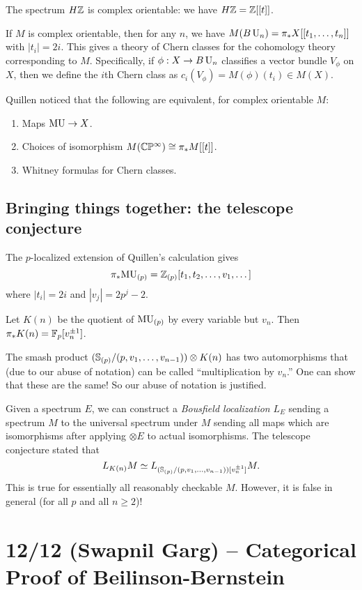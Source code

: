 \documentclass{article}
\begin{document}
\begin{ex}
	The spectrum $H\mathbb{Z}$ is complex orientable: we have $H\mathbb{Z} = \mathbb{Z}[[t]]$.
\end{ex}

If $M$ is complex orientable, then for any $n$, we have $M(B\operatorname{U}_n) = \pi_* X[[t_1, \dots, t_n]]$ with $|t_i| = 2i$.
This gives a theory of Chern classes for the cohomology theory corresponding to $M$.
Specifically, if $\phi: X \to B\operatorname{U}_n$ classifies a vector bundle $V_\phi$ on $X$, then we define the $i$th Chern class as $c_i(V_\phi) = M(\phi)(t_i) \in M(X)$.

Quillen noticed that the following are equivalent, for complex orientable $M$:
\begin{enumerate}
	\item Maps $\mathrm{MU} \to X$.
	\item Choices of isomorphism $M(\mathbb{C}\mathbb{P}^\infty) \cong \pi_* M [[t]]$.
	\item Whitney formulas for Chern classes.
\end{enumerate}

\subsection{Bringing things together: the telescope conjecture}

The $p$-localized extension of Quillen's calculation gives
\[
	\pi_* \mathrm{MU}_{(p)} = \mathbb{Z}_{(p)} [t_1, t_2, \dots, v_1, \dots]
\]
where $|t_i| = 2i$ and $|v_j| = 2p^j - 2$.

Let $K(n)$ be the quotient of $\mathrm{MU}_{(p)}$ by every variable but $v_n$.
Then $\pi_* K(n) = \mathbb{F}_p[v_n^{\pm 1}]$.

The smash product $(\mathbb{S}_{(p)} / (p, v_1, \dots, v_{n-1})) \otimes K(n)$ has two automorphisms that (due to our abuse of notation) can be called ``multiplication by $v_n$.''
One can show that these are the same!
So our abuse of notation is justified.

Given a spectrum $E$, we can construct a \emph{Bousfield localization} $L_E$ sending a spectrum $M$ to the universal spectrum under $M$ sending all maps which are isomorphisms after applying $\otimes E$ to actual isomorphisms.
The telescope conjecture stated that
\[
	L_{K(n)} M \simeq L_{(\mathbb{S}_{(p)} / (p, v_1, \dots, v_{n-1}))[v_n^{\pm 1}]} M.
\]
This is true for essentially all reasonably checkable $M$.
However, it is false in general (for all $p$ and all $n \geq 2$)!

\section{12/12 (Swapnil Garg) -- Categorical Proof of Beilinson-Bernstein}
\end{document}
